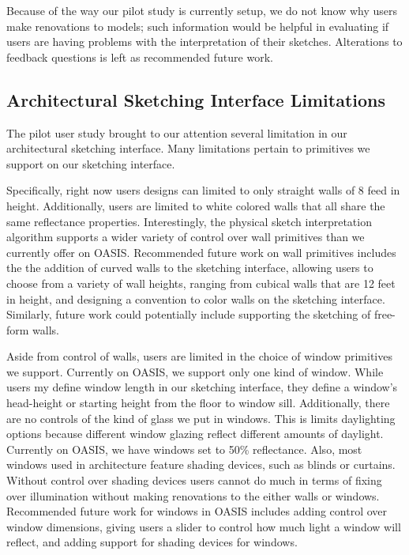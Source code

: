 		Because of the way our pilot study is currently setup, we do not know why users make renovations to models;
		such information would be helpful in evaluating if users are having problems with the interpretation of their sketches.
		Alterations to feedback questions is left as recommended future work.


\subsection{Architectural Sketching Interface Limitations}
	The pilot user study brought to our attention several limitation in our architectural sketching interface.
	Many limitations pertain to primitives we support on our sketching interface.

	Specifically, right now users designs can limited to only straight walls of 8 feed in height. Additionally, users are limited to white colored walls that all share the same reflectance properties. Interestingly, the physical sketch interpretation algorithm supports a wider variety of control over wall primitives than we currently offer on OASIS. Recommended future work on wall primitives includes the the addition of curved walls to the sketching interface, allowing users to choose from a variety of wall heights, ranging from cubical walls that are 12 feet in height, and designing a convention to color walls on the sketching interface.
	Similarly, future work could potentially include supporting the sketching of free-form walls. 

	Aside from control of walls, users are limited in the choice of window primitives we support.
	Currently on OASIS, we support only one kind of window. While users my define window length in our sketching interface, they define a window's head-height or starting height from the floor to window sill.
	Additionally, there are no controls of the kind of glass we put in windows. This is limits daylighting options because different window glazing reflect different amounts of daylight. Currently on OASIS, we have windows set to 50\% reflectance.
	Also, most windows used in architecture feature shading devices, such as blinds or curtains. Without control over shading devices users cannot do much in terms of fixing over illumination without making renovations to the either walls or windows.
	Recommended future work for windows in OASIS includes adding control over window dimensions, giving users a slider to control how much light a window will reflect, and adding support for shading devices for windows.

